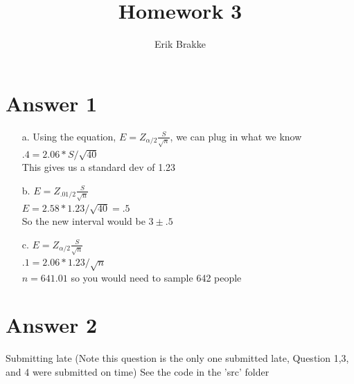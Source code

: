 \documentclass[11pt]{article}
\theoremstyle{definition}
\begin{document}
\title{Homework 3}
\author{Erik Brakke}
\maketitle

\thispagestyle{fancy}
 
 
\section*{Answer 1}
\begin{enumerate}
	\item[a.] Using the equation, $E = Z_{\alpha/2}\frac{S}{\sqrt{n}}$, we can plug in what we know\\
	$.4 = 2.06*S / \sqrt{40}$\\
	This gives us a standard dev of 1.23
	
	\item[b.] $E = Z_{.01/2}\frac{S}{\sqrt{n}}$\\
	$E = 2.58 * 1.23 / \sqrt{40} = .5$\\
	So the new interval would be $3 \pm .5$\\
	
	\item[c.] $E = Z_{\alpha/2}\frac{S}{\sqrt{n}}$\\
	$.1 = 2.06*1.23 / \sqrt{n}$\\
	$n = 641.01$ so you would need to sample 642 people
\end{enumerate}

\section*{Answer 2}
Submitting late (Note this question is the only one submitted late, Question 1,3, and 4 were submitted on time)
See the code in the 'src' folder
\end{document}
